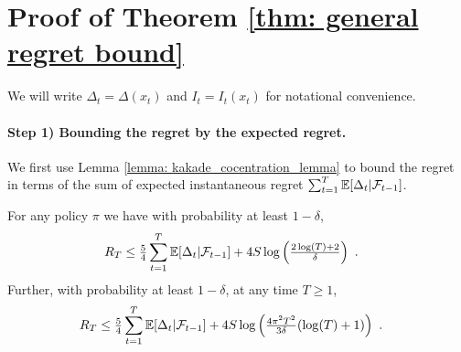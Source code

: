\section{Proof of Theorem \ref{thm: general regret bound}}\label{app: proof of main theorem}


We will write $\Delta_t = \Delta(x_t)$ and $I_t = I_t(x_t)$ for notational convenience.
\paragraph{Step 1) Bounding the regret by the expected regret.} 
We first use Lemma \ref{lemma: kakade_cocentration_lemma} to bound the regret in terms of the sum of expected instantaneous regret $\sum_{t=1}^T \mathbb{E}[\Delta_t|\mathcal{F}_{t-1}]$.
\begin{lemma}\label{lemma: bound regret by instantaneous regret}	
	For any policy $\pi$ we have with probability at least $1-\delta$,
	\begin{align*}
	R_T &\leq \tfrac{5}{4}  \sum_{t=1}^T \mathbb{E}[\Delta_t|\mathcal{F}_{t-1}] + 4 S \log\left(\tfrac{2 \log(T) + 2}{\delta}\right) \text{ .}
	\end{align*}
	Further, with probability at least $1-\delta$, at any time $T \geq 1$,
	\begin{align*}
	R_T &\leq \tfrac{5}{4}  \sum_{t=1}^T \mathbb{E}[\Delta_t|\mathcal{F}_{t-1}] + 4 S \log\left(\tfrac{4\pi^2 T^2}{3\delta} (\log(T) + 1)\right) \text{ .}
	\end{align*}
\end{lemma}
